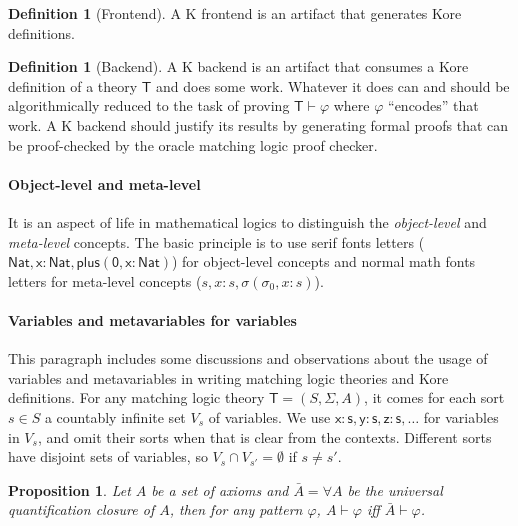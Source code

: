 \documentclass{article}
\newcounter{thmcounter}
\theoremstyle{plain}
\newtheorem{proposition}[thmcounter]{Proposition}
\theoremstyle{definition}
\newtheorem{definition}[thmcounter]{Definition}
\theoremstyle{remark}
\begin{document}
\begin{definition}[Frontend]
A K frontend is an artifact that generates Kore definitions.
\end{definition}

\begin{definition}[Backend]
A K backend is an artifact that consumes a Kore definition of a theory $\mathsf{T}$ and does some work. Whatever it does can and should be algorithmically reduced to the task of proving $\mathsf{T} \vdash \varphi$ where $\varphi$ ``encodes'' that work. A K backend should justify its results by generating formal proofs that can be proof-checked by the oracle matching logic proof checker.
\end{definition}

\paragraph{Object-level and meta-level}
It is an aspect of life in mathematical logics to distinguish the \emph{object-level} and \emph{meta-level} concepts. The basic principle is to use serif fonts letters ($\mathsf{Nat}, \mathsf{x:Nat}, \mathsf{plus(0, x:Nat)}$) for object-level concepts and normal math fonts letters for meta-level concepts ($s, x:s, \sigma(\sigma_0, x:s)$). 

\paragraph*{Variables and metavariables for variables}
This paragraph includes some discussions and observations about the usage of variables and metavariables in writing matching logic theories and Kore definitions. For any matching logic theory $\mathsf{T} = (S, \Sigma, A)$, it comes for each sort $s \in S$ a countably infinite set $V_s$ of variables. We use $\mathsf{x:s}, \mathsf{y:s}, \mathsf{z:s}, \dots$ for variables in $V_s$, and omit their sorts when that is clear from the contexts. Different sorts have disjoint sets of variables, so $V_s \cap V_{s'} = \emptyset$ if $s \neq s'$.



\begin{proposition}
\label{prop:explicitly_universal_quantified_justification}
Let $A$ be a set of axioms and $\bar{A} = \forall A$ be the universal quantification closure of $A$, then for any pattern $\varphi$, $A \vdash \varphi$ iff $\bar{A} \vdash \varphi$.
\end{proposition}
\end{document}
